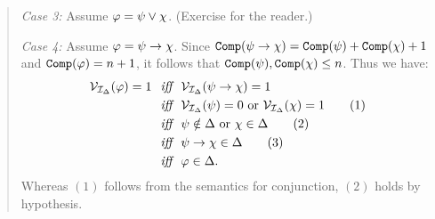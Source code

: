 \begin{quote}
  \textit{Case 3:}
  Assume $\varphi=\psi\vee\chi$.
  (Exercise for the reader.)

  \textit{Case 4:}
  Assume $\varphi=\psi\rightarrow\chi$.
  Since $\texttt{Comp}(\psi\rightarrow\chi)=\texttt{Comp}(\psi)+\texttt{Comp}(\chi)+1$ and  $\texttt{Comp}(\varphi)=n+1$, it follows that $\texttt{Comp}(\psi),\texttt{Comp}(\chi)\leq n$.
  Thus we have:
  \begin{align*}
    \mathcal{V}_{\mathcal{I}_{\Delta}}(\varphi)=1 &\textit{ ~iff~ } \mathcal{V}_{\mathcal{I}_{\Delta}}(\psi\rightarrow\chi)=1\\
      &\textit{ ~iff~ } \mathcal{V}_{\mathcal{I}_{\Delta}}(\psi) = 0 \text{ or } \mathcal{V}_{\mathcal{I}_{\Delta}}(\chi)=1   \tag{1}\\
      &\textit{ ~iff~ } \psi\notin\Delta \text{ or } \chi\in\Delta                    \tag{2}\\
      &\textit{ ~iff~ } \psi\rightarrow\chi\in\Delta                                         \tag{3}\\
      &\textit{ ~iff~ } \varphi\in\Delta.
  \end{align*}
  Whereas $(1)$ follows from the semantics for conjunction, $(2)$ holds by hypothesis.


\end{quote}
